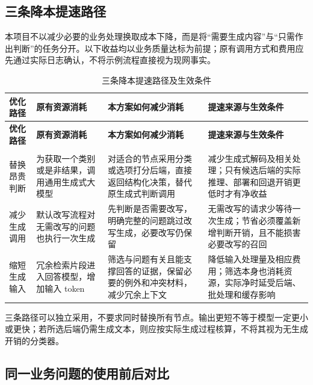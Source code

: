 \documentclass[UTF8,a4paper,11pt,fontset=windows]{ctexart}
\begin{document}
\subsection{三条降本提速路径}

本项目不以减少必要的业务处理换取成本下降，而是将“需要生成内容”与“只需作出判断”的任务分开。以下收益均以业务质量达标为前提；原有调用方式和费用应先通过实际日志确认，不将示例流程直接视为现网事实。


{\small\setlength{\tabcolsep}{4pt}\renewcommand{\arraystretch}{1.28}
\begin{longtable}{>{\raggedright\arraybackslash}p{0.150\dimexpr\linewidth-8\tabcolsep\relax}>{\raggedright\arraybackslash}p{0.240\dimexpr\linewidth-8\tabcolsep\relax}>{\raggedright\arraybackslash}p{0.290\dimexpr\linewidth-8\tabcolsep\relax}>{\raggedright\arraybackslash}p{0.320\dimexpr\linewidth-8\tabcolsep\relax}}
\caption{三条降本提速路径及生效条件}\label{tab:saving-paths}\\
\toprule
\textbf{优化路径} & \textbf{原有资源消耗} & \textbf{本方案如何减少消耗} & \textbf{提速来源与生效条件} \\
\midrule
\endfirsthead
\toprule
\textbf{优化路径} & \textbf{原有资源消耗} & \textbf{本方案如何减少消耗} & \textbf{提速来源与生效条件} \\
\midrule
\endhead
\midrule\multicolumn{4}{r}{\scriptsize\color{Muted}续下页}\\\endfoot
\bottomrule\endlastfoot
替换昂贵判断 & 为获取一个类别或是非结果，调用通用生成式大模型 & 对适合的节点采用分类或选项打分后端，直接返回结构化决策，替代原生成式判断调用 & 减少生成式解码及相关处理；只有候选后端的实际推理、部署和回退开销更低时才有净收益 \\
减少生成调用 & 默认改写流程对无需改写的问题也执行一次生成 & 先判断是否需要改写，明确完整的问题跳过改写生成，必要改写仍保留 & 无需改写的请求少等待一次生成；节省必须覆盖新增判断开销，且不能损害必要改写的召回 \\
缩短生成输入 & 冗余检索片段进入回答模型，增加输入 token & 筛选与问题有关且能支撑回答的证据，保留必要的例外和冲突材料，减少冗余上下文 & 降低输入处理量及相应费用；筛选本身也消耗资源，实际净时延受后端、批处理和缓存影响 \\
\end{longtable}}

三条路径可以独立采用，不要求同时替换所有节点。输出更短不等于模型一定更小或更快；若所选后端仍需生成文本，则应按实际生成过程核算，不将其视为无生成开销的分类器。


\subsection{同一业务问题的使用前后对比}
\end{document}
